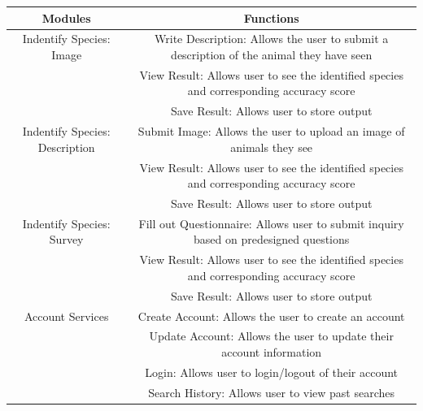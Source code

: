 \documentclass[]{article}
\begin{document}
\begin{center}
	\begin{tabular}{ |c|c| } 
	\hline
	Modules & Functions \\
	\hline
	Indentify Species: Image 
	& Write Description: Allows the user to submit a description of the animal they have seen \\ 
	& View Result: Allows user to see the identified species and corresponding accuracy score \\
	& Save Result: Allows user to store output \\
   \hline
   Indentify Species: Description & Submit Image: Allows the user to upload an image of animals they see \\ 
   & View Result: Allows user to see the identified species and corresponding accuracy score \\
   & Save Result: Allows user to store output \\
  \hline	
  \hline
  Indentify Species: Survey 
  & Fill out Questionnaire: Allows user to submit inquiry based on predesigned questions \\ 
  & View Result: Allows user to see the identified species and corresponding accuracy score \\
  & Save Result: Allows user to store output \\
 \hline	
  Account Services & Create Account: Allows the user to create an account\\ 
  & Update Account: Allows the user to update their account information \\ 
  & Login: Allows user to login/logout of their account  \\ 
  & Search History: Allows user to view past searches\\
 \hline
   \end{tabular}
\end{center}
\end{document}
